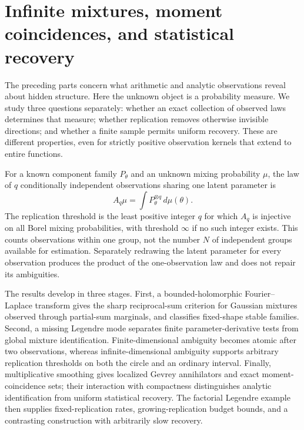 \documentclass[11pt,letterpaper]{article}
\theoremstyle{definition}
\theoremstyle{remark}
\newcommand{\1}{\mathbf 1}
\begin{document}
\clearpage

\part{Infinite mixtures, moment coincidences, and statistical recovery}
\label{part:mixtures}

The preceding parts concern what arithmetic and analytic observations
reveal about hidden structure. Here the unknown object is a probability
measure. We study three questions separately: whether an exact collection
of observed laws determines that measure; whether replication removes
otherwise invisible directions; and whether a finite sample permits
uniform recovery. These are different properties, even for strictly
positive observation kernels that extend to entire functions.

For a known component family $P_\theta$ and an unknown mixing
probability $\mu$, the law of $q$ conditionally independent observations
sharing one latent parameter is
\[
 A_q\mu=\int P_\theta^{\otimes q}\,d\mu(\theta).
\]
The replication threshold is the least positive integer $q$ for which
$A_q$ is injective on all Borel mixing probabilities, with threshold
$\infty$ if no such integer exists. This counts observations within
one group, not the number $N$ of independent groups available for
estimation. Separately redrawing the latent parameter for every
observation produces the product of the one-observation law and
does not repair its ambiguities.

The results develop in three stages. First, a bounded-holomorphic
Fourier--Laplace transform gives the sharp reciprocal-sum criterion
for Gaussian mixtures observed through partial-sum marginals, and
classifies fixed-shape stable families. Second, a missing Legendre
mode separates finite parameter-derivative tests from global mixture
identification. Finite-dimensional ambiguity becomes atomic after two
observations, whereas infinite-dimensional ambiguity supports arbitrary
replication thresholds on both the circle and an ordinary interval.
Finally, multiplicative smoothing gives localized Gevrey annihilators
and exact moment-coincidence sets; their interaction with compactness
distinguishes analytic identification from uniform statistical recovery.
The factorial Legendre example then supplies fixed-replication rates,
growing-replication budget bounds, and a contrasting construction with
arbitrarily slow recovery.
\end{document}
